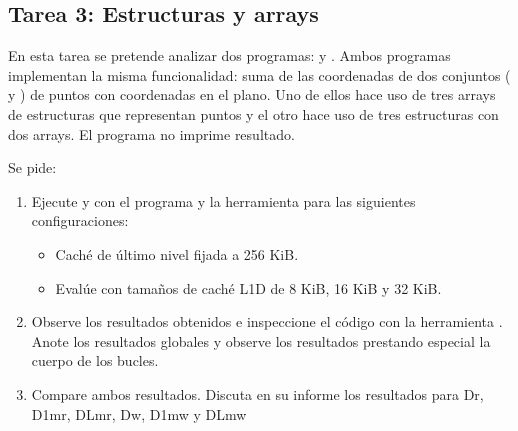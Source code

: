 \clearpage
\subsection{Tarea 3: Estructuras y arrays}

En esta tarea se pretende analizar dos programas:  y
. Ambos programas implementan la misma funcionalidad: suma de las
coordenadas de dos conjuntos ( y ) de puntos con coordenadas en el plano.
Uno de ellos hace uso de tres arrays de estructuras que representan puntos y el otro hace uso de tres estructuras con dos arrays. El programa no imprime resultado.




Se pide: 

\begin{enumerate}

\item Ejecute  y  con el programa  y la herramienta  para las siguientes configuraciones:

\begin{itemize}
\item Caché de último nivel fijada a 256 KiB.
\item Evalúe con tamaños de caché L1D de 8 KiB, 16 KiB y 32 KiB.
\end{itemize}

\item Observe los resultados obtenidos e inspeccione el código con la
herramienta . Anote los resultados globales y observe
los resultados prestando especial la cuerpo de los bucles.

\item Compare ambos resultados.
Discuta en su informe los resultados para Dr, D1mr, DLmr, Dw, D1mw y DLmw

\end{enumerate}


